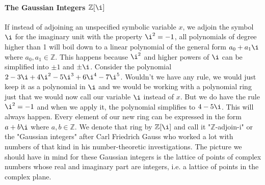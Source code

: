 




\paragraph{The Gaussian Integers $\mathbb{Z}[\i]$}
If instead of adjoining an unspecified symbolic variable $x$, we adjoin the symbol $\i$ for the imaginary unit with the property $\i^2 = -1$, all polynomials of degree higher than 1 will boil down to a linear polynomial of the general form $a_0 + a_1 \i$ where $a_0,a_1 \in \mathbb{Z}$. This happens because $\i^2$ and higher powers of $\i$ can be simplified into $\pm 1$ and $\pm \i$. Consider the polynomial $2 - 3 \i + 4 \i^2 - 5 \i^3 + 6 \i^4 - 7 \i^5$. Wouldn't we have any rule, we would just keep it as a polynomial in $\i$ and we would be working with a polynomial ring just that we would now call our variable $\i$ instead of $x$. But we do have the rule $\i^2 = -1$ and when we apply it, the polynomial simplifies to $4 - 5 \i$. This will always happen. Every element of our new ring can be expressed in the form $a + b \i$ where $a,b \in \mathbb{Z}$. We denote that ring by $\mathbb{Z}[\i]$ and call it "$\mathbb{Z}$-adjoin-i" or the "Gaussian integers" after Carl Friedrich Gauss who worked a lot with numbers of that kind in his number-theoretic investigations. The picture we should have in mind for these Gaussian integers is the lattice of points of complex numbers whose real and imaginary part are integers, i.e. a lattice of points in the complex plane.

